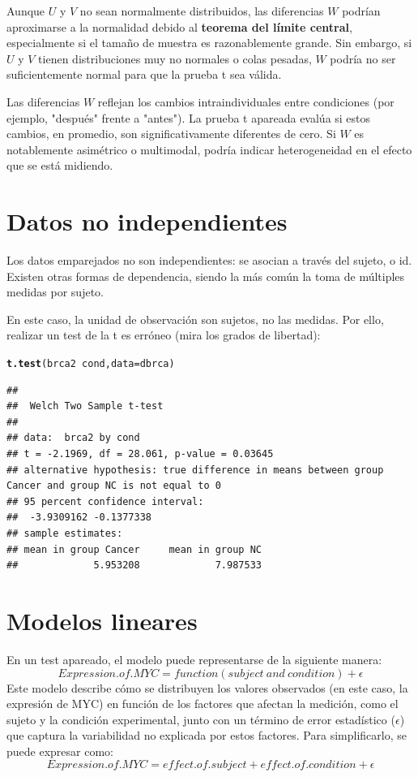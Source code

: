 \documentclass{config/apuntes}\usepackage[]{graphicx}\usepackage[]{xcolor}
\makeatletter
\newcommand{\hlopt}[1]{\textcolor[rgb]{0,0,0}{#1}}%
\newcommand{\hldef}[1]{\textcolor[rgb]{0.345,0.345,0.345}{#1}}%
\newcommand{\hlkwc}[1]{\textcolor[rgb]{0.333,0.667,0.333}{#1}}%
\newcommand{\hlkwd}[1]{\textcolor[rgb]{0.737,0.353,0.396}{\textbf{#1}}}%
\newenvironment{kframe}{%
 \def\at@end@of@kframe{}%
 \ifinner\ifhmode%
  \def\at@end@of@kframe{\end{minipage}}%
  \begin{minipage}{\columnwidth}%
 \fi\fi%
 \def\FrameCommand##1{\hskip\@totalleftmargin \hskip-\fboxsep
 \colorbox{shadecolor}{##1}\hskip-\fboxsep
     \hskip-\linewidth \hskip-\@totalleftmargin \hskip\columnwidth}%
 \MakeFramed {\advance\hsize-\width
   \@totalleftmargin\z@ \linewidth\hsize
   \@setminipage}}%
 {\par\unskip\endMakeFramed%
 \at@end@of@kframe}
\newenvironment{knitrout}{}{} %
\makeatother
\begin{document}
Aunque $U$ y $V$ no sean normalmente distribuidos, las diferencias $W$ podrían aproximarse a la normalidad debido al \textbf{teorema del límite central}, especialmente si el tamaño de muestra es razonablemente grande. Sin embargo, si $U$ y $V$ tienen distribuciones muy no normales o colas pesadas, $W$ podría no ser suficientemente normal para que la prueba t sea válida.

Las diferencias $W$ reflejan los cambios intraindividuales entre condiciones (por ejemplo, "después" frente a "antes"). La prueba t apareada evalúa si estos cambios, en promedio, son significativamente diferentes de cero. Si $W$ es notablemente asimétrico o multimodal, podría indicar heterogeneidad en el efecto que se está midiendo.

\section{Datos no independientes}
Los datos emparejados no son independientes: se asocian a través del sujeto, o id. Existen otras formas de dependencia, siendo la más común la toma de múltiples medidas por sujeto.



En este caso, la unidad de observación son sujetos, no las medidas. Por ello, realizar un test de la t es erróneo (mira los grados de libertad):

\begin{knitrout}
\color{fgcolor}\begin{kframe}
\begin{alltt}
\hlkwd{t.test}\hldef{(brca2} \hlopt{~} \hldef{cond,} \hlkwc{data} \hldef{= dbrca)}
\end{alltt}
\begin{verbatim}
## 
## 	Welch Two Sample t-test
## 
## data:  brca2 by cond
## t = -2.1969, df = 28.061, p-value = 0.03645
## alternative hypothesis: true difference in means between group Cancer and group NC is not equal to 0
## 95 percent confidence interval:
##  -3.9309162 -0.1377338
## sample estimates:
## mean in group Cancer     mean in group NC 
##             5.953208             7.987533
\end{verbatim}
\end{kframe}
\end{knitrout}

\section{Modelos lineares}
En un test apareado, el modelo puede representarse de la siguiente manera:
\[Expression.of.MYC = function(subject\ and\ condition) + \epsilon\]
Este modelo describe cómo se distribuyen los valores observados (en este caso, la expresión de MYC) en función de los factores que afectan la medición, como el sujeto y la condición experimental, junto con un término de error estadístico ($\epsilon$) que captura la variabilidad no explicada por estos factores. 
Para simplificarlo, se puede expresar como:
\[Expression.of.MYC = \mathit{effect.of.subject} + \mathit{effect.of.condition} + \epsilon\]
\end{document}
